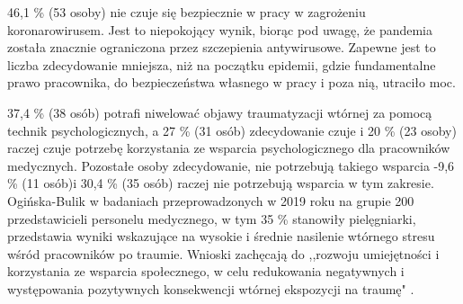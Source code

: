 \documentclass[a4paper,12pt,twoside,openany]{report}
\begin{document}
46,1 \% (53 osoby) nie  czuje się bezpiecznie w pracy w zagrożeniu koronarowirusem. Jest to niepokojący wynik, biorąc pod uwagę, że pandemia została znacznie ograniczona przez szczepienia antywirusowe. Zapewne jest to liczba zdecydowanie mniejsza, niż na początku epidemii, gdzie fundamentalne prawo pracownika, do bezpieczeństwa własnego w pracy i poza nią, utraciło moc.

 37,4 \% (38 osób) potrafi niwelować objawy traumatyzacji wtórnej za pomocą technik psychologicznych, a 27 \% (31 osób) zdecydowanie czuje i 20 \% (23 osoby) raczej czuje potrzebę korzystania ze wsparcia psychologicznego dla pracowników medycznych. Pozostałe osoby zdecydowanie, nie potrzebują takiego wsparcia -9,6 \%  (11 osób)i 30,4 \% (35 osób) raczej nie potrzebują wsparcia w tym zakresie. Ogińska-Bulik w badaniach przeprowadzonych w 2019 roku na grupie 200 przedstawicieli personelu medycznego, w tym 35 \% stanowiły pielęgniarki, przedstawia wyniki wskazujące na wysokie i średnie nasilenie wtórnego stresu wśród pracowników po traumie. Wnioski zachęcają do ,,rozwoju umiejętności i korzystania ze wsparcia społecznego, w celu redukowania negatywnych i występowania pozytywnych konsekwencji wtórnej ekspozycji na traumę" \cite{trauma}. 
\end{document}
